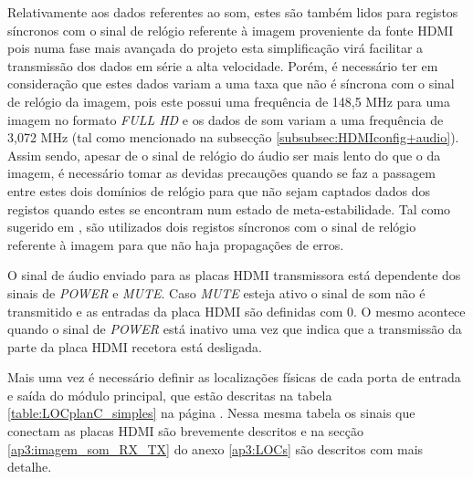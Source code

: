 Relativamente aos dados referentes ao som, estes são também lidos para registos síncronos com o sinal de relógio referente à imagem proveniente da fonte HDMI pois numa fase mais avançada do projeto esta simplificação virá facilitar a transmissão dos dados em série a alta velocidade. Porém, é necessário ter em consideração que estes dados variam a uma taxa que não é síncrona com o sinal de relógio da imagem, pois este possui uma frequência de 148,5 MHz para uma imagem no formato \textit{FULL HD} e os dados de som variam a uma frequência de 3,072 MHz (tal como mencionado na subsecção \ref{subsubsec:HDMIconfig+audio}). Assim sendo, apesar de o sinal de relógio do áudio ser mais lento do que o da imagem, é necessário tomar as devidas precauções quando se faz a passagem entre estes dois domínios de relógio para que não sejam captados dados dos registos quando estes se encontram num estado de meta-estabilidade. Tal como sugerido em \cite{R024}, são utilizados dois registos síncronos com o sinal de relógio referente à imagem para que não haja propagações de erros.

O sinal de áudio enviado para as placas HDMI transmissora está dependente dos sinais de \textit{POWER} e \textit{MUTE}. Caso \textit{MUTE} esteja ativo o sinal de som não é transmitido e as entradas da placa HDMI são definidas com 0. O mesmo acontece quando o sinal de \textit{POWER} está inativo uma vez que indica que a transmissão da parte da placa HDMI recetora está desligada.

Mais uma vez é necessário definir as localizações físicas de cada porta de entrada e saída do módulo principal, que estão descritas na tabela \ref{table:LOCplanC_simples} na página \pageref{table:LOCplanC_simples}. Nessa mesma tabela os sinais que conectam as placas HDMI são brevemente descritos e na secção \ref{ap3:imagem_som_RX_TX} do anexo \ref{ap3:LOCs} são descritos com mais detalhe.\\



